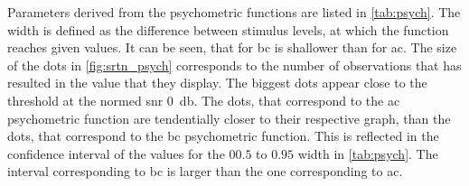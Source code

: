 


Parameters derived from the psychometric functions are listed in \autoref{tab:psych}. The width is defined  as the difference between stimulus levels, at which the function reaches given values. 
It can be seen, that for \gls{bc} is shallower than for \gls{ac}.
The size of the dots in \autoref{fig:srtn_psych} corresponds to the number of observations that has resulted in the value that they display. The biggest dots appear close to the threshold at the normed \gls{snr} \SI{0}{\decibel}.
The dots, that correspond to the \gls{ac} psychometric function are tendentially closer to their respective graph, than the dots, that correspond to the \gls{bc} psychometric function.
This is reflected in the confidence interval of the values for the $00.5$ to $0.95$ width in \autoref{tab:psych}. The interval corresponding to \gls{bc} is larger than the one corresponding to \gls{ac}. 



